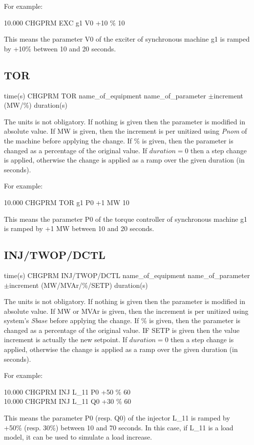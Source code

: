 For example:

10.000 CHGPRM EXC g1 V0 +10 \% 10 

This
means the parameter V0 of the exciter of synchronous machine g1 is
ramped by +10\% between 10 and 20 seconds.


\subsection{TOR}

time(s) CHGPRM TOR name\_of\_equipment name\_of\_parameter
	$\pm$increment (MW/\%) duration(s) 
	
The units is
not obligatory. If nothing is given then the parameter is modified
in absolute value. If MW is given, then the increment is per unitized
using \emph{Pnom} of the machine before applying the change. If \%
is given, then the parameter is changed as a percentage of the original
value. If $duration=0$ then a step change is applied, otherwise the
change is applied as a ramp over the given duration (in seconds). 

For example:

10.000 CHGPRM TOR g1 P0 +1 MW 10 

This
means the parameter P0 of the torque controller of synchronous machine
g1 is ramped by +1 MW between 10 and 20 seconds.


\subsection{INJ/TWOP/DCTL}

time(s) CHGPRM INJ/TWOP/DCTL name\_of\_equipment
	name\_of\_parameter $\pm$increment (MW/MVAr/\%/SETP) duration(s)

The units is not obligatory. If nothing is given
then the parameter is modified in absolute value. If MW or MVAr is
given, then the increment is per unitized using system's \emph{Sbase}
before applying the change. If \% is given, then the parameter is
changed as a percentage of the original value. IF SETP is given then
the value increment is actually the new setpoint. If $duration=0$
then a step change is applied, otherwise the change is applied as
a ramp over the given duration (in seconds). 

For example:

10.000 CHGPRM INJ L\_11 P0 +50 \% 60 \\
10.000 CHGPRM INJ L\_11 Q0 +30 \% 60 
	
	This means the
parameter P0 (resp. Q0) of the injector L\_11 is ramped by +50\% (resp.
30\%) between 10 and 70 seconds. In this case, if L\_11 is a load
model, it can be used to simulate a load increase.


